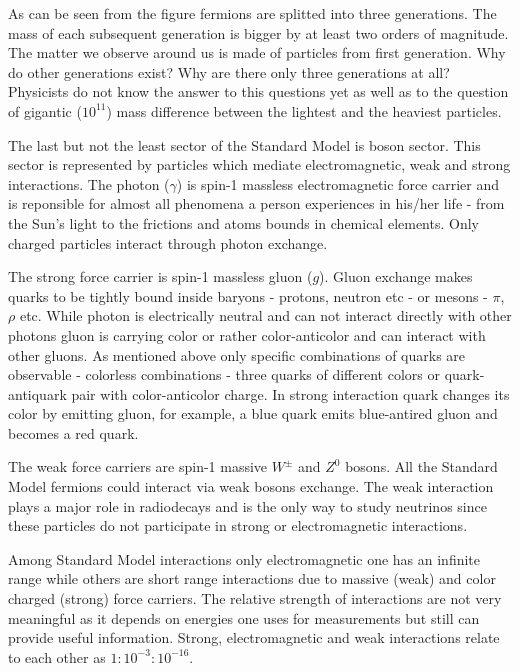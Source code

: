 As can be seen from the figure  fermions are splitted into three generations. The mass of each 
subsequent generation is bigger by at least two orders of magnitude. The matter we observe 
around us is made of particles from first generation. Why do other generations exist? Why are
there only three generations at all? Physicists do not know the answer to this questions yet 
as well as to the question of gigantic ($10^{11}$) mass difference between the lightest and
the heaviest particles. 

The last but not the least sector of the Standard Model is boson sector. This sector is 
represented by particles which mediate electromagnetic, weak and strong interactions. The photon
($\gamma$) is spin-1 massless electromagnetic force carrier and is reponsible for almost all phenomena 
a person experiences in his/her life - from the Sun's light to the frictions and atoms bounds in 
chemical elements. Only charged particles interact through photon exchange.

The strong force carrier is spin-1 massless gluon ($g$). Gluon exchange makes quarks to be tightly bound
inside baryons - protons, neutron etc - or mesons - $\pi$, $\rho$ etc. While photon is electrically
neutral and can not interact directly with other photons gluon is carrying color or
rather color-anticolor and can interact with other gluons. As mentioned above only specific 
combinations of quarks are observable - colorless combinations - three quarks of different colors
or quark-antiquark pair with color-anticolor charge. In strong interaction quark changes its color
by emitting gluon, for example, a blue quark emits blue-antired gluon and becomes a red quark.

The weak force carriers are spin-1 massive $W^\pm$ and $Z^0$ bosons. All the Standard Model fermions 
could interact via weak bosons exchange. The weak interaction plays a major role in radiodecays and
is the only way to study neutrinos since these particles do not participate in strong or
electromagnetic interactions.

Among Standard Model interactions only electromagnetic one has an infinite range while others
are short range interactions due to massive (weak) and color charged (strong) force carriers. 
The relative strength of interactions are not very meaningful as it depends on energies one uses
for measurements but still can provide useful information. Strong, electromagnetic and weak interactions
relate to each other as $1:10^{-3}:10^{-16}$.

